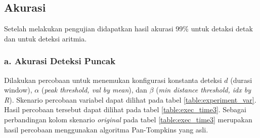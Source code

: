 

\subsection{Akurasi}
Setelah melakukan pengujian didapatkan hasil akurasi 99\% untuk detaksi detak dan \accuracy untuk deteksi aritmia.
\subsubsection{a. Akurasi Deteksi Puncak}
Dilakukan percobaan untuk menemukan konfigurasi konstanta deteksi $d$ (durasi window), $\alpha$ (\textit{peak threshold, val by mean}), dan $\beta$ (\textit{min distance threshold, idx by R}). Skenario percobaan variabel dapat dilihat pada tabel \ref{table:experiment_var}. Hasil percobaan tersebut dapat dilihat pada tabel \ref{table:exec_time3}. Sebagai perbandingan kolom skenario \textit{original} pada tabel \ref{table:exec_time3} merupakan hasil percobaan menggunakan algoritma Pan-Tompkins yang asli.

